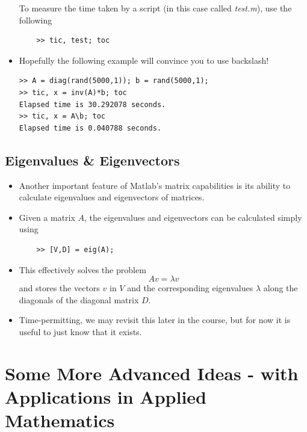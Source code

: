 \documentclass[12pt]{report}
\begin{document}
\begin{itemize}
\begin{tcolorbox}[title=Task]
	\tcblower
	To measure the time taken by a script (in this case called \textit{test.m}), use the following
	\begin{lstlisting}
	>> tic, test; toc
	\end{lstlisting}
\end{tcolorbox}
\item Hopefully the following example will convince you to use backslash! 
\begin{lstlisting}
>> A = diag(rand(5000,1)); b = rand(5000,1);
>> tic, x = inv(A)*b; toc
Elapsed time is 30.292078 seconds.
>> tic, x = A\b; toc
Elapsed time is 0.040788 seconds.
\end{lstlisting}
\end{itemize}

\subsection*{Eigenvalues \& Eigenvectors}

\begin{itemize}
	\item Another important feature of Matlab's matrix capabilities is its ability to calculate eigenvalues and eigenvectors of matrices.
	\item Given a matrix $A$, the eigenvalues and eigenvectors can be calculated simply using
	\begin{lstlisting}
	>> [V,D] = eig(A);
	\end{lstlisting}
	\item This effectively solves the problem
	\begin{displaymath}
	Av = \lambda v
	\end{displaymath}
	and stores the vectors $v$ in $V$ and the corresponding eigenvalues $\lambda$ along the diagonals of the diagonal matrix $D$.
	\item Time-permitting, we may revisit this later in the course, but for now it is useful to just know that it exists.
\end{itemize}

\section*{Some More Advanced Ideas - with Applications in Applied Mathematics}
\end{document}
